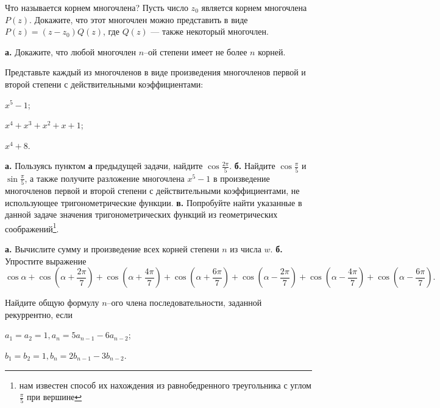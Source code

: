 \documentclass[a4paper, 12pt, num=22]{listok}
\begin{document}
\begin{problem}
	Что называется корнем многочлена?
	Пусть число $z_0$ является корнем многочлена $P(z)$.
	Докажите, что этот многочлен можно представить в виде $P(z) = (z - z_0)Q(z)$,
	где $Q(z)$ --- также некоторый многочлен.
\end{problem}
\begin{problem}
	\textbf{а.} Докажите, что любой многочлен $n$--ой степени имеет не более $n$ корней.
\end{problem}
\begin{problem}
	Представьте каждый из многочленов в виде произведения многочленов первой и второй степени с действительными коэффициентами:
	\begin{multienum}{3}
		\item $x^5 - 1$;
		\item $x^4 + x^3 + x^2 + x + 1$;
		\item $x^4 + 8$.
	\end{multienum}
\end{problem}
\begin{problem}
	\textbf{а.} Пользуясь пунктом \textbf{а} предыдущей задачи, найдите $\cos{\frac{2\pi}5}$.
	\textbf{б.} Найдите $\cos{\frac \pi 5}$ и $\sin{\frac \pi 5}$,
	а также получите разложение многочлена $x^5 - 1$ в произведение многочленов первой и
	второй степени с действительными коэффициентами, не использующее тригонометрические функции.
	\textbf{в.} Попробуйте найти указанные в данной задаче значения тригонометрических функций
	из геометрических соображений\footnote{нам известен способ их нахождения из равнобедренного треугольника с углом $\frac \pi 5$ при вершине}.
\end{problem}
\begin{problem}
	\textbf{а.} Вычислите сумму и произведение всех корней степени $n$ из числа $w$.
	\textbf{б.} Упростите выражение
	\[
		\cos \alpha
		+ \cos{(\alpha + \frac{2\pi}7)} + \cos{(\alpha + \frac{4\pi}7)} + \cos{(\alpha + \frac{6\pi}7)}
		+ \cos{(\alpha - \frac{2\pi}7)} + \cos{(\alpha - \frac{4\pi}7)} + \cos{(\alpha - \frac{6\pi}7)}.
	\]
\end{problem}
\begin{problem}
	Найдите общую формулу $n$--ого члена последовательности, заданной рекуррентно, если
	\begin{multienum}{2}
		\item $a_1 = a_2 = 1, a_n = 5a_{n-1} - 6a_{n-2}$;
		\item $b_1 = b_2 = 1, b_n = 2b_{n-1} - 3b_{n-2}$.
	\end{multienum}
\end{problem}
\end{document}
